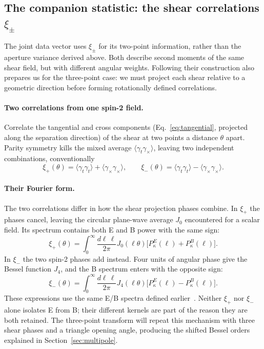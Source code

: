 \documentclass[11pt]{article}
\numberwithin{equation}{section}
\begin{document}
\subsection{The companion statistic: the shear correlations
  \texorpdfstring{$\xi_\pm$}{xi plus and minus}}
\label{sec:xipm}

The joint data vector uses $\xi_\pm$ for its two-point information,
rather than the aperture variance derived above. Both describe second
moments of the same shear field, but with different angular weights.
Following their construction also prepares us for the three-point case:
we must project each shear relative to a geometric direction before
forming rotationally defined correlations.

\paragraph{Two correlations from one spin-2 field.}
Correlate the tangential and cross components
(Eq.~\eqref{eq:tangential}, projected along the separation
direction) of the shear at two points a distance $\theta$ apart.
Parity symmetry kills the mixed average
$\langle\gamma_t\gamma_\times\rangle$, leaving two independent
combinations, conventionally
\begin{equation}
  \xi_+(\theta)
  = \langle\gamma_t\gamma_t\rangle
  + \langle\gamma_\times\gamma_\times\rangle ,
  \qquad
  \xi_-(\theta)
  = \langle\gamma_t\gamma_t\rangle
  - \langle\gamma_\times\gamma_\times\rangle .
  \label{eq:xipmdef}
\end{equation}

\paragraph{Their Fourier form.}
The two correlations differ in how the shear projection phases combine.
In $\xi_+$ the phases cancel, leaving the circular plane-wave average
$J_0$ encountered for a scalar field. Its spectrum contains both E and B
power with the same sign:
\begin{equation}
 \xi_+(\theta)=\int_0^\infty\frac{d\ell\,\ell}{2\pi}
 J_0(\ell\theta)\bigl[P_\kappa^E(\ell)+P_\kappa^B(\ell)\bigr].
 \label{eq:xipmplus}
\end{equation}
In $\xi_-$ the two spin-2 phases add instead. Four units of angular
phase give the Bessel function $J_4$, and the B spectrum enters with the
opposite sign:
\begin{equation}
 \xi_-(\theta)=\int_0^\infty\frac{d\ell\,\ell}{2\pi}
 J_4(\ell\theta)\bigl[P_\kappa^E(\ell)-P_\kappa^B(\ell)\bigr].
 \label{eq:xipm}
\end{equation}
These expressions use the same E/B spectra defined earlier~\cite{GomesTATT}.
Neither $\xi_+$ nor $\xi_-$ alone isolates E from B; their different
kernels are part of the reason they are both retained. The three-point
transform will repeat this mechanism with three shear phases and a
triangle opening angle, producing the shifted Bessel orders explained
in Section~\ref{sec:multipole}.
\end{document}
